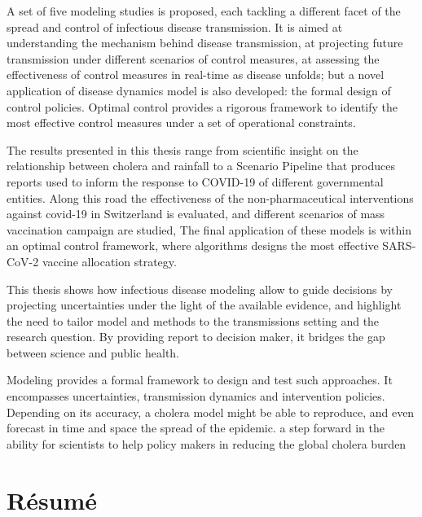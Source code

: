 A set of five modeling studies is proposed, each tackling a different facet of the spread and control of infectious disease transmission. It is aimed at understanding the mechanism behind disease transmission, at projecting future transmission under different scenarios of control measures, at assessing the effectiveness of control measures in real-time as disease unfolds; but a novel application of disease dynamics model is also developed: the formal design of control policies. Optimal control provides a rigorous framework to identify the most effective control measures under a set of operational constraints.

The results presented in this thesis range from scientific insight on the relationship between cholera and rainfall to a Scenario Pipeline that produces reports used to inform the response to COVID-19 of different governmental entities. Along this road the effectiveness of the non-pharmaceutical interventions against covid-19 in Switzerland is evaluated, and different scenarios of mass vaccination campaign are studied,  The final application of these models is within an optimal control framework, where algorithms designs the most effective SARS-CoV-2 vaccine allocation strategy.

This thesis shows how infectious disease modeling allow to guide decisions by projecting uncertainties under the light of the available evidence, and highlight the need to tailor model and methods to the transmissions setting and the research question. By providing report to decision maker, it bridges the gap between science and public health.

Modeling provides a formal framework to design and test such approaches. It encompasses uncertainties, transmission dynamics and intervention policies. Depending on its accuracy, a cholera model might be able to reproduce, and even forecast in time and space the spread of the epidemic. a step forward in the ability for scientists to help policy makers in reducing the global cholera burden

 
 \chapter*{Résumé} 
 
